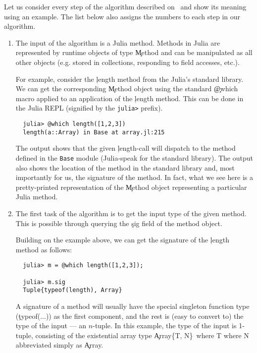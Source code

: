\documentclass[sigplan,screen]{acmart}
\begin{document}
Let us consider every step of the algorithm described
on~ and show its meaning using an example.
The list below also assigns the numbers to each step in our algorithm.
\begin{enumerate}

  \item The input of the algorithm is a Julia method. Methods in Julia are
  represented by runtime objects of type \c{Method} and can be manipulated as
  all other objects (e.g. stored in collections, responding to field accesses, etc.).

  For example, consider the \c{length} method from the Julia's standard library. We can
  get the corresponding \c{Method} object using the standard \c{@which} macro
  applied to an application of the \c{length} method. This can be done in the
  Julia REPL (signified by the \texttt{julia>} prefix).
\begin{verbatim}
  julia> @which length([1,2,3])
  length(a::Array) in Base at array.jl:215
\end{verbatim}

  The output shows that the given \c{length}-call will dispatch to the
  method defined in the \texttt{Base} module (Julia-speak for the standard
  library). The output also shows the location of the method in the
  standard library and, most importantly for us, the signature of the
  method. In fact, what we see here is a pretty-printed representation of
  the \c{Method} object representing a particular Julia method.

  \item The first task of the algorithm is to get the input type of the given
  method. This is possible through querying the \c{sig} field of the method object.

  Building on the example above, we can get the signature of the \c{length}
  method as follows:
\begin{verbatim}
  julia> m = @which length([1,2,3]);

  julia> m.sig
  Tuple{typeof(length), Array}
\end{verbatim}

  A signature of a method will usually have the special singleton function
  type (\c{typeof(...)}) as the first component, and the rest is (easy to
  convert to) the type of the input --- an $n$-tuple. In this example, the type of
  the input is 1-tuple, consisting of the existential array type
  \c{Array\{T, N\}\ where T where N} abbreviated simply as \c{Array}.


\end{enumerate}
\end{document}
